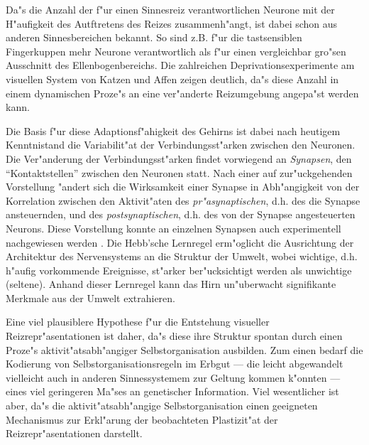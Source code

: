 Da"s die Anzahl der f"ur einen Sinnesreiz verantwortlichen Neurone mit der
H"aufigkeit des Autftretens des Reizes zusammenh"angt, ist dabei schon aus
anderen Sinnesbereichen bekannt.  So sind z.B. f"ur die tastsensiblen
Fingerkuppen mehr Neurone verantwortlich als f"ur einen vergleichbar
gro"sen Ausschnitt des Ellenbogenbereichs. Die zahlreichen
Deprivationsexperimente am visuellen System von Katzen und Affen zeigen
deutlich, da"s diese Anzahl in einem dynamischen Proze"s an eine
ver"anderte Reizumgebung angepa"st werden kann.

Die Basis f"ur diese Adaptionsf"ahigkeit des Gehirns ist dabei nach
heutigem Kenntnistand die Variabilit"at der Verbindungsst"arken zwischen
den Neuronen.  Die Ver"anderung der Verbindungsst"arken findet vorwiegend
an \emph{Synapsen}, den ``Kontaktstellen'' zwischen den Neuronen statt.
Nach einer auf  zur"uckgehenden Vorstellung "andert
sich die Wirksamkeit einer Synapse in Abh"angigkeit von der Korrelation
zwischen den Aktivit"aten des \emph{pr"asynaptischen}, d.h. des die Synapse
ansteuernden, und des \emph{postsynaptischen}, d.h. des von der Synapse
angesteuerten Neurons. Diese Vorstellung konnte an einzelnen Synapsen auch
experimentell nachgewiesen werden \cite{brown:1990,kirkwood:1994}.  Die
Hebb'sche Lernregel erm"oglicht die Ausrichtung der Architektur des
Nervensystems an die Struktur der Umwelt, wobei wichtige, d.h. h"aufig
vorkommende Ereignisse, st"arker ber"ucksichtigt werden als unwichtige
(seltene). Anhand dieser Lernregel kann das Hirn un"uberwacht signifikante
Merkmale aus der Umwelt extrahieren.

Eine viel plausiblere Hypothese f"ur die Entstehung visueller
Reizrepr"asentationen ist daher, da"s diese ihre Struktur spontan durch
einen Proze"s aktivit"atsabh"angiger Selbstorganisation ausbilden.  Zum
einen bedarf die Kodierung von Selbstorganisationsregeln im Erbgut --- die
leicht abgewandelt vielleicht auch in anderen Sinnessystemem zur Geltung
kommen k"onnten --- eines viel geringeren Ma"ses an genetischer
Information.  Viel wesentlicher ist aber, da"s die aktivit"atsabh"angige
Selbstorganisation einen geeigneten Mechanismus zur Erkl"arung der
beobachteten Plastizit"at der Reizrepr"asentationen darstellt.
